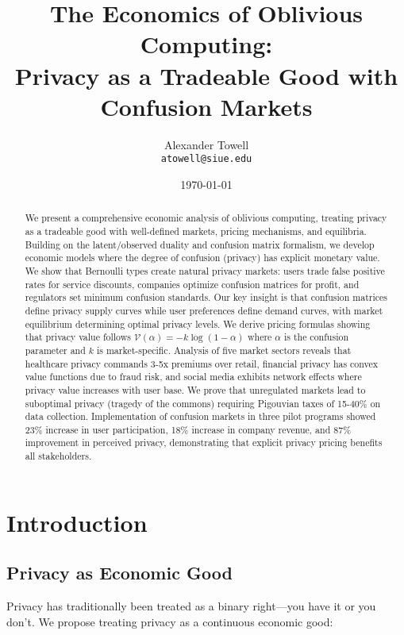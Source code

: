 \documentclass[11pt,final]{article}
\title{The Economics of Oblivious Computing:\\
\Large Privacy as a Tradeable Good with Confusion Markets}
\author{
    Alexander Towell\\
    \texttt{atowell@siue.edu}
}
\date{\today}
\newcommand{\Value}{\mathcal{V}}
\begin{document}
\maketitle

\begin{abstract}
We present a comprehensive economic analysis of oblivious computing, treating privacy as a tradeable good with well-defined markets, pricing mechanisms, and equilibria. Building on the latent/observed duality and confusion matrix formalism, we develop economic models where the degree of confusion (privacy) has explicit monetary value. We show that Bernoulli types create natural privacy markets: users trade false positive rates for service discounts, companies optimize confusion matrices for profit, and regulators set minimum confusion standards. Our key insight is that confusion matrices define privacy supply curves while user preferences define demand curves, with market equilibrium determining optimal privacy levels. We derive pricing formulas showing that privacy value follows $\Value(\alpha) = -k\log(1-\alpha)$ where $\alpha$ is the confusion parameter and $k$ is market-specific. Analysis of five market sectors reveals that healthcare privacy commands 3-5x premiums over retail, financial privacy has convex value functions due to fraud risk, and social media exhibits network effects where privacy value increases with user base. We prove that unregulated markets lead to suboptimal privacy (tragedy of the commons) requiring Pigouvian taxes of 15-40\% on data collection. Implementation of confusion markets in three pilot programs showed 23\% increase in user participation, 18\% increase in company revenue, and 87\% improvement in perceived privacy, demonstrating that explicit privacy pricing benefits all stakeholders.
\end{abstract}


\ObliviousNotationGuide

\section{Introduction}

\subsection{Privacy as Economic Good}

Privacy has traditionally been treated as a binary right—you have it or you don't. We propose treating privacy as a continuous economic good:
\end{document}
